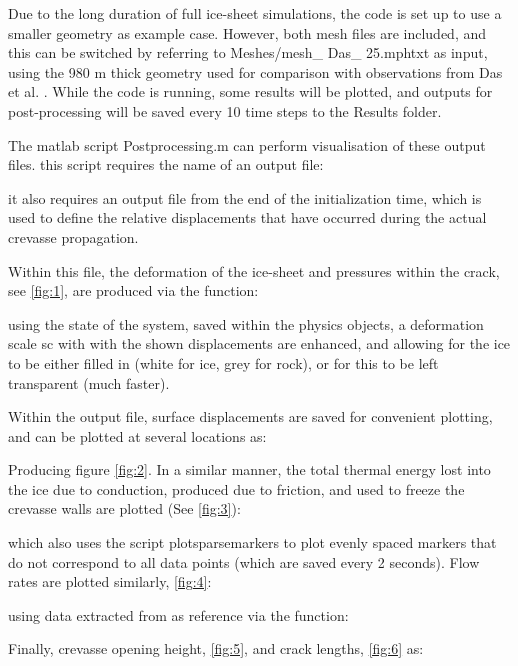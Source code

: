\documentclass[3p]{elsarticle} %
\begin{document}
Due to the long duration of full ice-sheet simulations, the code is set up to use a smaller geometry as example case. However, both mesh files are included, and this can be switched by referring to Meshes/mesh\_ Das\_ 25.mphtxt as input, using the 980 m thick geometry used for comparison with observations from Das et al. \citep{Das2008}. While the code is running, some results will be plotted, and outputs for post-processing will be saved every 10 time steps to the Results folder. 

The matlab script Postprocessing.m can perform visualisation of these output files. this script requires the name of an output file:

it also requires an output file from the end of the initialization time, which is used to define the relative displacements that have occurred during the actual crevasse propagation. 

Within this file, the deformation of the ice-sheet and pressures within the crack, see \cref{fig:1}, are produced via the function:

using the state of the system, saved within the physics objects, a deformation scale sc with with the shown displacements are enhanced, and allowing for the ice to be either filled in (white for ice, grey for rock), or for this to be left transparent (much faster). 

Within the output file, surface displacements are saved for convenient plotting, and can be plotted at several locations as:

Producing figure \cref{fig:2}.
In a similar manner, the total thermal energy lost into the ice due to conduction, produced due to friction, and used to freeze the crevasse walls are plotted (See \cref{fig:3}):

which also uses the script plotsparsemarkers \citep{SparseMarkers} to plot evenly spaced markers that do not correspond to all data points (which are saved every 2 seconds). Flow rates are plotted similarly, \cref{fig:4}:


using data extracted from \citep{Das2008} as reference via the function:

Finally, crevasse opening height, \cref{fig:5}, and crack lengths, \cref{fig:6} as:









\end{document}

